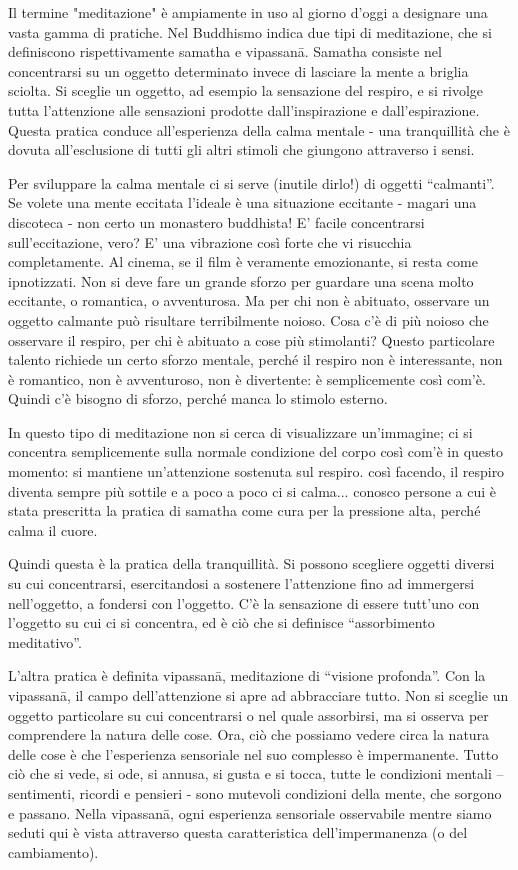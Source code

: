 
Il termine "meditazione" è ampiamente in uso al giorno d'oggi a
designare una vasta gamma di pratiche. Nel Buddhismo indica due tipi di
meditazione, che si definiscono rispettivamente samatha e vipassanā.
Samatha consiste nel concentrarsi su un oggetto determinato invece di
lasciare la mente a briglia sciolta. Si sceglie un oggetto, ad esempio
la sensazione del respiro, e si rivolge tutta l'attenzione alle
sensazioni prodotte dall'inspirazione e dall'espirazione. Questa pratica
conduce all'esperienza della calma mentale - una tranquillità che è
dovuta all'esclusione di tutti gli altri stimoli che giungono attraverso
i sensi.

Per sviluppare la calma mentale ci si serve (inutile dirlo!) di oggetti
“calmanti”. Se volete una mente eccitata l'ideale è una situazione
eccitante - magari una discoteca - non certo un monastero buddhista! E'
facile concentrarsi sull'eccitazione, vero? E' una vibrazione così forte
che vi risucchia completamente. Al cinema, se il film è veramente
emozionante, si resta come ipnotizzati. Non si deve fare un grande
sforzo per guardare una scena molto eccitante, o romantica, o
avventurosa. Ma per chi non è abituato, osservare un oggetto calmante
può risultare terribilmente noioso. Cosa c'è di più noioso che osservare
il respiro, per chi è abituato a cose più stimolanti? Questo particolare
talento richiede un certo sforzo mentale, perché il respiro non è
interessante, non è romantico, non è avventuroso, non è divertente: è
semplicemente così com'è. Quindi c'è bisogno di sforzo, perché manca lo
stimolo esterno.

In questo tipo di meditazione non si cerca di visualizzare un'immagine;
ci si concentra semplicemente sulla normale condizione del corpo così
com'è in questo momento: si mantiene un'attenzione sostenuta sul
respiro. così facendo, il respiro diventa sempre più sottile e a poco a
poco ci si calma... conosco persone a cui è stata prescritta la pratica
di samatha come cura per la pressione alta, perché calma il cuore.

Quindi questa è la pratica della tranquillità. Si possono scegliere
oggetti diversi su cui concentrarsi, esercitandosi a sostenere
l'attenzione fino ad immergersi nell'oggetto, a fondersi con l'oggetto.
C'è la sensazione di essere tutt'uno con l'oggetto su cui ci si
concentra, ed è ciò che si definisce “assorbimento meditativo”.

L'altra pratica è definita vipassanā, meditazione di “visione profonda”.
Con la vipassanā, il campo dell'attenzione si apre ad abbracciare tutto.
Non si sceglie un oggetto particolare su cui concentrarsi o nel quale
assorbirsi, ma si osserva per comprendere la natura delle cose. Ora, ciò
che possiamo vedere circa la natura delle cose è che l'esperienza
sensoriale nel suo complesso è impermanente. Tutto ciò che si vede, si
ode, si annusa, si gusta e si tocca, tutte le condizioni mentali –
sentimenti, ricordi e pensieri - sono mutevoli condizioni della mente,
che sorgono e passano. Nella vipassanā, ogni esperienza sensoriale
osservabile mentre siamo seduti qui è vista attraverso questa
caratteristica dell'impermanenza (o del cambiamento).

